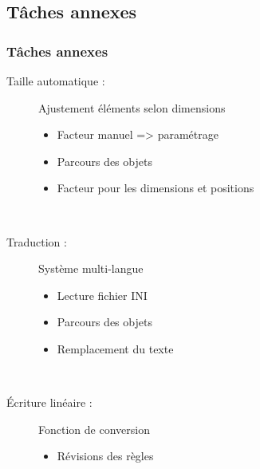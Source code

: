 \subsection{Tâches annexes}

\begin{frame}
	\frametitle{Tâches annexes}

	\begin{description}
		\item[Taille automatique :] Ajustement éléments selon dimensions
			\begin{itemize}
				\item Facteur \og manuel \fg{} => paramétrage
				\item Parcours des objets
				\item Facteur pour les dimensions et positions
			\end{itemize}~

		\item[Traduction : ] Système multi-langue
			\begin{itemize}
				\item Lecture fichier INI
				\item Parcours des objets
				\item Remplacement du texte
			\end{itemize}~

		\item[Écriture linéaire :] Fonction de conversion
			\begin{itemize}
				\item Révisions des règles
			\end{itemize}
	\end{description}
\end{frame}
